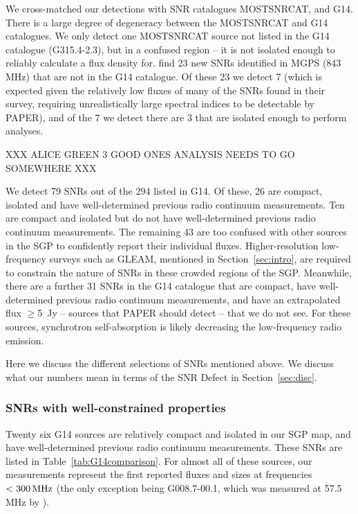 \documentclass[useAMS,usenatbib]{mn2e}
\begin{document}
We cross-matched our detections with SNR catalogues MOSTSNRCAT, \cite{AGreen.14} and G14. There is a large degree of degeneracy between the MOSTSNRCAT and G14 catalogues. We only detect one MOSTSNRCAT source not listed in the G14 catalogue (G315.4-2.3), but in a confused region -- it is not isolated enough to reliably calculate a flux density for. \cite{AGreen.14} find 23 new SNRs identified in MGPS (843\,MHz) that are not in the G14 catalogue. Of these 23 we detect 7 (which is expected given the relatively low fluxes of many of the SNRs found in their survey, requiring unrealistically large spectral indices to be detectable by PAPER), and of the 7 we detect there are 3 that are isolated enough to perform analyses.

XXX ALICE GREEN 3 GOOD ONES ANALYSIS NEEDS TO GO SOMEWHERE XXX

We detect 79 SNRs out of the 294 listed in G14. Of these, 26 are compact, isolated and have well-determined previous radio continuum measurements. Ten are compact and isolated but do not have well-determined previous radio continuum measurements. The remaining 43 are too confused with other sources in the SGP to confidently report their individual fluxes. Higher-resolution low-frequency surveys such as GLEAM, mentioned in Section~\ref{sec:intro}, are required to constrain the nature of SNRs in these crowded regions of the SGP. Meanwhile, there are a further 31 SNRs in the G14 catalogue that are compact, have well-determined previous radio continuum measurements, and have an extrapolated flux $\geq$5\, Jy -- sources that PAPER should detect -- that we do not see. For these sources, synchrotron self-absorption is likely decreasing the low-frequency radio emission.

Here we discuss the different selections of SNRs mentioned above. We discuss what our numbers mean in terms of the SNR Defect in Section~\ref{sec:disc}.

\subsubsection{SNRs with well-constrained properties}

Twenty six G14 sources are relatively compact and isolated in our SGP map, and have well-determined previous radio continuum measurements. These SNRs are listed in Table~\ref{tab:G14comparison}. For almost all of these sources, our measurements represent the first reported fluxes and sizes at frequencies $<300\,{\rm MHz}$ (the only exception being G008.7-00.1, which was measured at 57.5\,MHz by \citealt{Odegard.86}).
\end{document}
